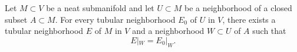 Let $M \subset V$ be a neat submanifold and let $U \subset M$ be a neighborhood of a closed subset $A \subset M$. For every tubular neighborhood $E_0$ of $U$ in $V$, there exists a tubular neighborhood $E$ of $M$ in $V$ and a neighborhood $W \subset U$ of $A$ such that
$$E|_{W} = E_0|_{W}.$$
